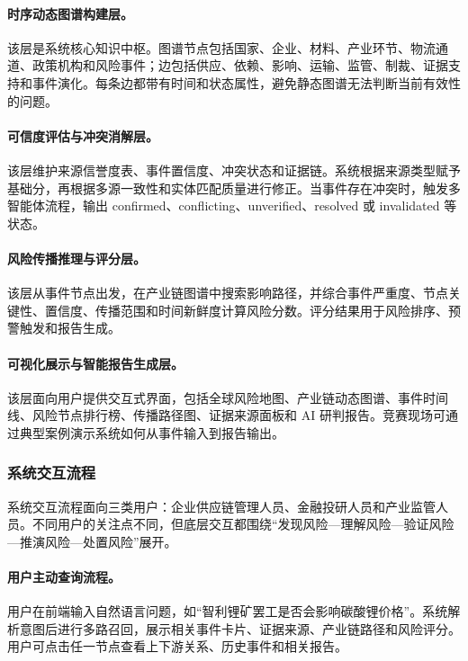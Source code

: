 \documentclass[12pt,a4paper]{article}
\begin{document}
\paragraph{时序动态图谱构建层。}该层是系统核心知识中枢。图谱节点包括国家、企业、材料、产业环节、物流通道、政策机构和风险事件；边包括供应、依赖、影响、运输、监管、制裁、证据支持和事件演化。每条边都带有时间和状态属性，避免静态图谱无法判断当前有效性的问题。

\paragraph{可信度评估与冲突消解层。}该层维护来源信誉度表、事件置信度、冲突状态和证据链。系统根据来源类型赋予基础分，再根据多源一致性和实体匹配质量进行修正。当事件存在冲突时，触发多智能体流程，输出 confirmed、conflicting、unverified、resolved 或 invalidated 等状态。

\paragraph{风险传播推理与评分层。}该层从事件节点出发，在产业链图谱中搜索影响路径，并综合事件严重度、节点关键性、置信度、传播范围和时间新鲜度计算风险分数。评分结果用于风险排序、预警触发和报告生成。

\paragraph{可视化展示与智能报告生成层。}该层面向用户提供交互式界面，包括全球风险地图、产业链动态图谱、事件时间线、风险节点排行榜、传播路径图、证据来源面板和 AI 研判报告。竞赛现场可通过典型案例演示系统如何从事件输入到报告输出。

\subsubsection{系统交互流程}

系统交互流程面向三类用户：企业供应链管理人员、金融投研人员和产业监管人员。不同用户的关注点不同，但底层交互都围绕“发现风险—理解风险—验证风险—推演风险—处置风险”展开。

\paragraph{用户主动查询流程。}用户在前端输入自然语言问题，如“智利锂矿罢工是否会影响碳酸锂价格”。系统解析意图后进行多路召回，展示相关事件卡片、证据来源、产业链路径和风险评分。用户可点击任一节点查看上下游关系、历史事件和相关报告。
\end{document}
